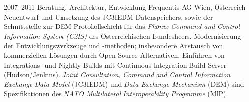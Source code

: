 \cventry
{2007--2011}
{Beratung, Architektur, Entwicklung}
{}
{Frequentis AG}
{Wien, Österreich}
{
  Neuentwurf und Umsetzung des JC3IEDM Datenspeichers, sowie der Schnittstelle
  zur DEM Protokollschicht für das \emph{Phönix Command and Control Information System (C2IS)}
  des Österreichischen Bundesheers.
  Modernisierung der Entwicklungswerkzeuge und -methoden; insbesondere Austausch von
  kommerziellen Lösungen durch Open-Source Alternativen.
  Einführen von Integrations- und Nightly Builds mit Continuous Integration Build Server (Hudson/Jenkins).
  \emph{Joint Consultation, Command and Control Information Exchange Data Model}
  (JC3IEDM) und \emph{Data Exchange Mechanism} (DEM) sind Spezifikationen des
  \emph{NATO Multilateral Interoperability Programme} (MIP).
}
